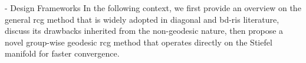 \documentclass[journal]{IEEEtran}
\begin{document}
\begin{section}{- Design Frameworks}
	In the following context, we first provide an overview on the general \gls{rcg} method that is widely adopted in diagonal and \gls{bd}-\gls{ris} literature, discuss its drawbacks inherited from the non-geodesic nature, then propose a novel group-wise geodesic \gls{rcg} method that operates directly on the Stiefel manifold for faster convergence.


\end{section}
\end{document}
